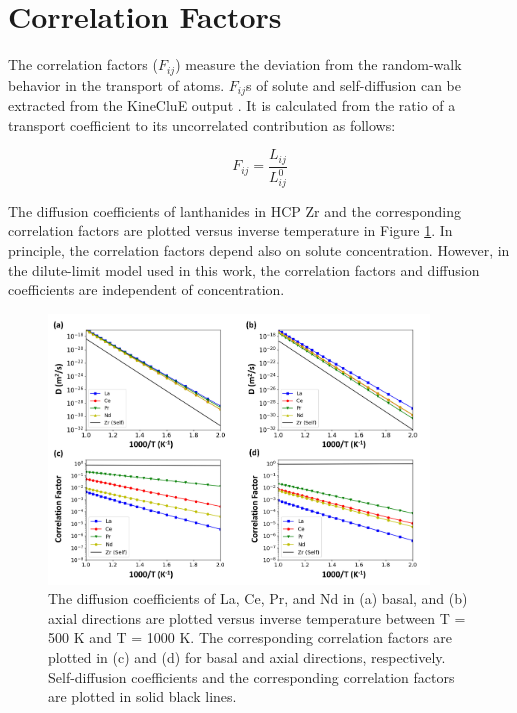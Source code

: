\documentclass[preprint,12pt]{elsarticle}
\begin{document}
\FloatBarrier

\section{Correlation Factors}
\label{appendix_correlation}

\setcounter{figure}{0}
\setcounter{table}{0}

The correlation factors ($F_{ij}$) measure the deviation from the random-walk behavior in the transport of atoms. $F_{ij}$s of solute and self-diffusion can be extracted from the KineCluE output \cite{schuler_kineclue_2020}. It is calculated from the ratio of a transport coefficient to its uncorrelated contribution \cite{schuler_kineclue_2020} as follows:

\begin{equation}
    F_{ij} = \frac{L_{ij}}{L_{ij}^0}
\end{equation}

The diffusion coefficients of lanthanides in HCP Zr 
and the corresponding correlation factors are plotted versus inverse temperature in Figure \ref{fig:correlation_factors}. In principle, the correlation factors depend also on solute concentration. However, in the dilute-limit model used in this work, the correlation factors and diffusion coefficients are independent of concentration.

\begin{figure}[h!]
    \centering
    \includegraphics[width=0.9\textwidth]{13_correlation_factors.jpg}
    \caption{The diffusion coefficients of La, Ce, Pr, and Nd in (a) basal, and (b) axial directions are plotted versus inverse temperature between T = 500 K and T = 1000 K. The corresponding correlation factors are plotted in (c) and (d) for basal and axial directions, respectively. Self-diffusion coefficients and the corresponding correlation factors are plotted in solid black lines.}
    \label{fig:correlation_factors}
\end{figure}

\FloatBarrier
  

\end{document}
